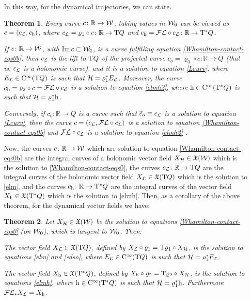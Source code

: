 \documentclass[12pt]{report}
\newtheorem{teor}{Theorem}[chapter]
\def\vf{\mathfrak X}
\def\Lag{{\cal L}}
\def\Real{\mathbb{R}}
\def\Tan{{\rm T}}
\def\Cinfty{{\rm C}^\infty}
\def\Leg{{\cal F}\Lag}
\begin{document}
In this way, for the dynamical trajectories, we can state.

\begin{teor}
\label{eqW}
Every curve $c\colon \Real\to{\cal W}$,
taking values in ${\cal W}_0$ can be viewed as
$c=(c_\Lag,c_{\rm h})$, where
$c_\Lag=\varrho_1\circ c\colon \Real \to\Tan Q$
and $c_{\rm h}=
\Leg\circ c_\Lag\colon\Real\to\Tan^*Q$.

If $c\colon\Real\to{\cal W}$,
with  ${\rm Im}\,c\subset{\cal W}_0$,
is a curve fulfilling equation \eqref{Whamilton-contact-eqs0b}, then
$c_\Lag$ is the lift to
$\Tan Q$ of the projected curve
$c_o=\varrho_0\circ c\colon\Real\to Q$ 
(that is, $c_\Lag$ is a holonomic curve),
and it is a solution to equation \eqref{Lcurv},
where $E_\Lag\in\Cinfty(\Tan Q)$ is such that ${\cal H}=\varrho_1^*E_\Lag$.
Moreover, the curve  
$c_{\rm h}=\varrho_2\circ c=\Leg\circ c_\Lag$
is a solution to equation \eqref{elmh2},
where ${\rm h}\in\Cinfty(\Tan^*Q)$ is such that 
${\cal H}=\varrho_1^*{\rm h}$.

Conversely, if $c_o\colon\Real\to Q$ is a curve such that
$\widetilde c_o\equiv c_\Lag$ is a solution to equation \eqref{Lcurv}, then the curve
$c=(c_\Lag,\Leg\circ c_\Lag)$
is a solution to equation \eqref{Whamilton-contact-eqs0b}
and $\Leg\circ c_\Lag$
is a solution to equation \eqref{elmh2}
 \label{mainteor1}.
\end{teor}

Now, the curves $c\colon\Real\to{\cal W}$ which are
solution to equation \eqref{Whamilton-contact-eqs0b}
are the integral curves of a holonomic vector field $X_{\cal H}\in\vf({\cal W})$ 
which is the solution to \eqref{Whamilton-contact-eqs0},
the curves $c_\Lag\colon\Real\to\Tan Q$
are the integral curves of the holonomic vector field $X_\Lag\in\vf(\Tan Q)$ which is the
solution to  \eqref{elm}, and  the curves $c_{\rm h}\colon\Real\to\Tan^*Q$
are the integral curves of the vector field $X_{\rm h}\in\vf(\Tan^*Q)$ 
which is the solution to  \eqref{elmh}.
Then, as a corollary of the above theorem, 
for the dynamical vector fields we have:

\begin{teor}
\label{eqL1}
Let $X_{\cal H}\in\vf({\cal W})$ be the solution to equations \eqref{Whamilton-contact-eqs0} (on ${\cal W}_0$),
which is tangent to  ${\cal W}_0$.  Then:

The vector field $X_\Lag\in\vf(\Tan Q)$, defined by
$X_\Lag\circ\varrho_1=\Tan\varrho_1\circ X_{\cal H}$,
is the solution to equations \eqref{elm} and \eqref{edso},
where $E_\Lag\in\Cinfty(\Tan Q)$ is such that ${\cal H}=\varrho_1^*E_\Lag$.

The vector field $X_{\rm h}\in\vf(\Tan^*Q)$, defined by
$X_{\rm h}\circ\varrho_2=\Tan\varrho_2\circ X_{\cal H}$,
is the solution to equations \eqref{elmh},
where ${\rm h}\in\Cinfty(\Tan^*Q)$ is such that 
${\cal H}=\varrho_1^*{\rm h}$.
Furthermore $\Leg_*X_\Lag=X_{\rm h}$.
\end{teor}
\end{document}
